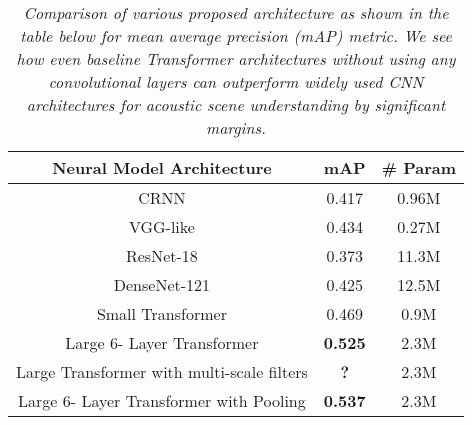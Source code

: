 \documentclass{article}
\begin{document}
\begin{sloppy}
\begin{table}[ht]
  \caption{\itshape Comparison of various proposed architecture as shown in the table below for mean average precision (mAP) metric. We see how even baseline Transformer architectures without using any convolutional layers can outperform widely used CNN architectures for acoustic scene understanding by significant margins. \cite{fonseca2020fsd50k} }
	\centering
	\begin{tabular}{|c|c|c|}
		\hline
		Neural Model Architecture & mAP & \# Param\\\hline
		CRNN \cite{fonseca2020fsd50k} & 0.417 & 0.96M\\
		VGG-like \cite{fonseca2020fsd50k} & 0.434 & 0.27M \\
		ResNet-18 \cite{fonseca2020fsd50k} & 0.373  & 11.3M\\
		DenseNet-121 \cite{fonseca2020fsd50k} & 0.425 & 12.5M \\\hline
		Small Transformer & 0.469 & 0.9M\\
		Large 6- Layer Transformer & \textbf{0.525}  & 2.3M \\
		Large Transformer with multi-scale filters & \textbf{?}  & 2.3M \\
		Large 6- Layer Transformer with Pooling &  \textbf{0.537} & 2.3M
        \\\hline
	\end{tabular}
\label{tab:example}
\end{table}






\end{sloppy}
\end{document}
